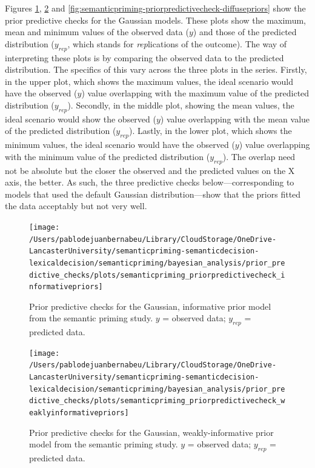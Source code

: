 \documentclass[
  12pt,
  man,floatsintext]{apa7}
\begin{document}
Figures \ref{fig:semanticpriming-priorpredictivecheck-informativepriors}, \ref{fig:semanticpriming-priorpredictivecheck-weaklyinformativepriors} and \ref{fig:semanticpriming-priorpredictivecheck-diffusepriors} show the prior predictive checks for the Gaussian models. These plots show the maximum, mean and minimum values of the observed data (\(y\)) and those of the predicted distribution (\(y_{rep}\), which stands for \emph{rep}lications of the outcome). The way of interpreting these plots is by comparing the observed data to the predicted distribution. The specifics of this vary across the three plots in the series. Firstly, in the upper plot, which shows the maximum values, the ideal scenario would have the observed (\(y\)) value overlapping with the maximum value of the predicted distribution (\(y_{rep}\)). Secondly, in the middle plot, showing the mean values, the ideal scenario would show the observed (\(y\)) value overlapping with the mean value of the predicted distribution (\(y_{rep}\)). Lastly, in the lower plot, which shows the minimum values, the ideal scenario would have the observed (\(y\)) value overlapping with the minimum value of the predicted distribution (\(y_{rep}\)). The overlap need not be absolute but the closer the observed and the predicted values on the X axis, the better. As such, the three predictive checks below---corresponding to models that used the default Gaussian distribution---show that the priors fitted the data acceptably but not very well.



\begin{figure}

{\centering \texttt{[image: /Users/pablodejuanbernabeu/Library/CloudStorage/OneDrive-LancasterUniversity/semanticpriming-semanticdecision-lexicaldecision/semanticpriming/bayesian\_analysis/prior\_predictive\_checks/plots/semanticpriming\_priorpredictivecheck\_informativepriors]} 

}

\caption{Prior predictive checks for the Gaussian, informative prior model from the semantic priming study. \(y\) = observed data; \(y_{rep}\) = predicted data.}\label{fig:semanticpriming-priorpredictivecheck-informativepriors}
\end{figure}



\begin{figure}

{\centering \texttt{[image: /Users/pablodejuanbernabeu/Library/CloudStorage/OneDrive-LancasterUniversity/semanticpriming-semanticdecision-lexicaldecision/semanticpriming/bayesian\_analysis/prior\_predictive\_checks/plots/semanticpriming\_priorpredictivecheck\_weaklyinformativepriors]} 

}

\caption{Prior predictive checks for the Gaussian, weakly-informative prior model from the semantic priming study. \(y\) = observed data; \(y_{rep}\) = predicted data.}\label{fig:semanticpriming-priorpredictivecheck-weaklyinformativepriors}
\end{figure}
\end{document}
